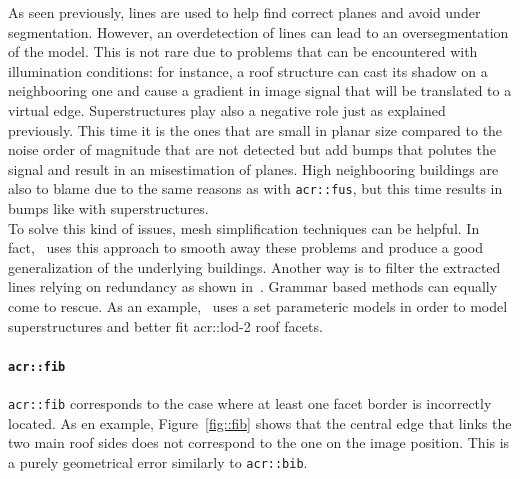                 As seen previously, lines are used to help find correct planes and avoid under segmentation.
                However, an overdetection of lines can lead to an oversegmentation of the model.
                This is not rare due to problems that can be encountered with illumination conditions: for instance, a roof structure can cast its shadow on a neighbooring one and cause a gradient in image signal that will be translated to a virtual edge.
                Superstructures play also a negative role just as explained previously.
                This time it is the ones that are small in planar size compared to the noise order of magnitude that are not detected but add bumps that polutes the signal and result in an misestimation of planes.
                High neighbooring buildings are also to blame due to the same reasons as with \texttt{\gls{acr::fus}}, but this time results in bumps like with superstructures.\\

                To solve this kind of issues, mesh simplification techniques can be helpful.
                In fact,~\textcite{verdie2015lod} uses this approach to smooth away these problems and produce a good generalization of the underlying buildings.
                Another way is to filter the extracted lines relying on redundancy as shown in~\textcite{michelin2013quality}.
                Grammar based methods can equally come to rescue.
                As an example,~\textcite{bredif20073d} uses a set parameteric models in order to model superstructures and better fit \gls{acr::lod}-2 roof facets.

            \paragraph{\texttt{\acrlong*{acr::fib}}}
                \texttt{\gls{acr::fib}} corresponds to the case where at least one facet border is incorrectly located.
                As en example, Figure~\ref{fig::fib} shows that the central edge that links the two main roof sides does not correspond to the one on the image position.
                This is a purely geometrical error similarly to \texttt{\gls{acr::bib}}.\\


